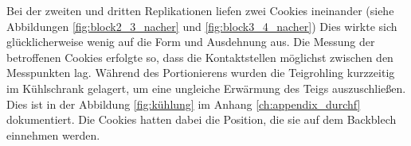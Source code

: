 

Bei der zweiten und dritten Replikationen liefen zwei Cookies ineinander (siehe Abbildungen \ref{fig:block2_3_nacher} und \ref{fig:block3_4_nacher})
Dies wirkte sich glücklicherweise wenig auf die Form und Ausdehnung aus.
Die Messung der betroffenen Cookies erfolgte so, dass die Kontaktstellen möglichst zwischen den Messpunkten lag.
Während des Portionierens wurden die Teigrohling kurzzeitig im Kühlschrank gelagert, um eine ungleiche Erwärmung des Teigs auszuschließen.
Dies ist in der Abbildung \ref{fig:kühlung} im Anhang \ref{ch:appendix_durchf} dokumentiert.
Die Cookies hatten dabei die Position, die sie auf dem Backblech einnehmen werden.